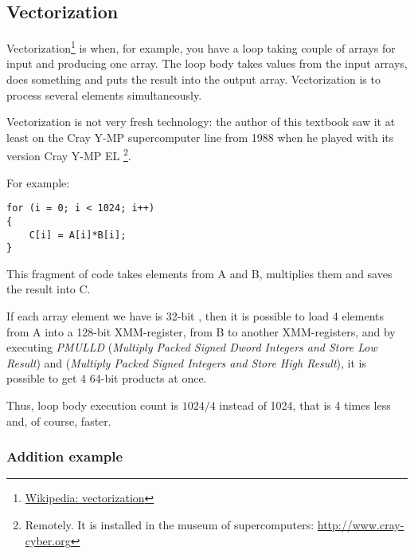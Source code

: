 ﻿\subsection{Vectorization}

\newcommand{\URLVEC}{\href{http://en.wikipedia.org/wiki/Vectorization_(computer_science)}{Wikipedia: vectorization}}

Vectorization\footnote{\URLVEC} is when, for example, you have a loop taking couple of arrays for input and producing one array.
The loop body takes values from the input arrays, does something and puts the result into the output array.
Vectorization is to process several elements simultaneously.

Vectorization is not very fresh technology: the author of this textbook saw it at least on the Cray Y-MP 
supercomputer line from 1988 when he played with its  version Cray Y-MP EL
\footnote{Remotely. It is installed in the museum of supercomputers: \url{http://www.cray-cyber.org}}.

For example:

\begin{lstlisting}[style=customc]
for (i = 0; i < 1024; i++)
{
    C[i] = A[i]*B[i];
}
\end{lstlisting}

This fragment of code takes elements from A and B, multiplies them and saves the result into C.

\newcommand{\PMULLD}{\emph{PMULLD} (\emph{Multiply Packed Signed Dword Integers and Store Low Result})}
\newcommand{\PMULHW}{\TT{PMULHW} (\emph{Multiply Packed Signed Integers and Store High Result})}

If each array element we have is 32-bit \Tint, then it is possible to load 4 elements from A into a 128-bit 
XMM-register, from B to another XMM-registers, and by executing \PMULLD{} and \PMULHW{}, 
it is possible to get 4 64-bit \glspl{product} at once.

Thus, loop body execution count is $1024/4$ instead of 1024, that is 4 times less and, of course, faster.

\newcommand{\URLINTELVEC}{\href{http://www.intel.com/intelpress/sum_vmmx.htm}{Excerpt: Effective Automatic Vectorization}}

\subsubsection{Addition example}

